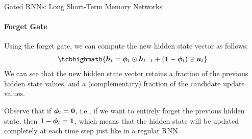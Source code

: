 \begin{frame}{Gated RNN\textsc{s}: Long Short-Term Memory Networks}
	\framesubtitle{Forget Gate}
Using the forget gate, we can compute the new hidden state vector as follows:
\begin{align*}
    \tcbhighmath{
    \bh_t  = \bphi_t \odot \bh_{t-1} + (\bone -\bphi_t) \odot
\bu_t}
\end{align*}
We can
see that the new hidden state vector retains a fraction of the previous
hidden state values, and a (complementary) fraction of
the candidate update values.

\medskip

Observe that if ${\bm \phi}_t = \mathbf{0}$, i.e., if we want to entirely
forget the previous hidden state, then $\mathbf{1}-{\bm \phi}_t = \mathbf{1}$, which
means that the hidden state will be updated completely at each time step
just like in a regular RNN. 
\end{frame}
%
%
